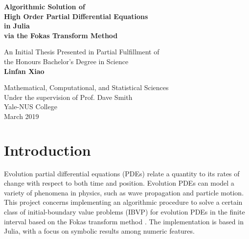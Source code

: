 \documentclass[11pt, oneside, a4paper]{article}
\begin{document}
\begin{titlepage}
\begin{center}
\vspace{1cm}
\huge
\textbf{Algorithmic Solution of\\ High Order Partial Differential Equations\\
in Julia\\ via the Fokas Transform Method}

\LARGE
\vspace{.5cm}
An Initial Thesis Presented in Partial Fulfillment of\\ the Honours Bachelor's Degree in Science\\
\vspace{.5cm}
\textbf{Linfan Xiao}\\
\vspace{.5cm}
\Large
\vspace{.5cm}
\Large
\end{center}

\vfill
\begin{center}	
Mathematical, Computational, and Statistical Sciences\\
Under the supervision of Prof. Dave Smith\\
Yale-NUS College\\
March 2019\\
\end{center}
\end{titlepage}
\tableofcontents
\listoffigures
\listoftables
\pagebreak
{}

\pagebreak
{}

\section{Introduction}
Evolution partial differential equations (PDEs) relate a quantity to its rates of change with respect to both time and position. Evolution PDEs can model a variety of phenomena in physics, such as wave propagation and particle motion. This project concerns implementing an algorithmic procedure to solve a certain class of initial-boundary value problems (IBVP) for evolution PDEs in the finite interval \cite{Smith2016} based on the Fokas transform method \cite{Fokas2008}. The implementation is based in Julia, with a focus on symbolic results among numeric features.
\end{document}
